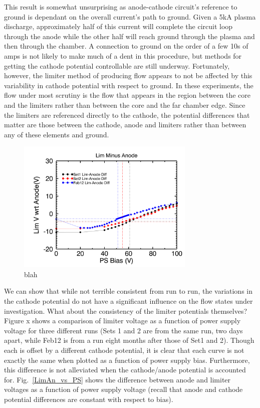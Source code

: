 \documentclass[aip,pop,amsmath,amssymb,preprint,superscriptaddress]{revtex4-1} %
\begin{document}
This result is somewhat unsurprising as anode-cathode circuit's reference to ground is dependant on the overall current's path to ground. Given a 5kA plasma discharge, approximately half of this current will complete the circuit loop through the anode while the other half will reach ground through the plasma and then through the chamber. A connection to ground on the order of a few 10s of amps is not likely to make much of a dent in this procedure, but methods for getting the cathode potential controllable are still underway. Fortunately, however, the limiter method of producing flow appears to not be affected by this variability in cathode potential with respect to ground. In these experiments, the flow under most scrutiny is the flow that appears in the region between the core and the limiters rather than between the core and the far chamber edge. Since the limiters are referenced directly to the cathode, the potential differences that matter are those between the cathode, anode and limiters rather than between any of these elements and ground.

\begin{figure}[!htbp]
\centerline{
\includegraphics[width=8.5cm]{LimAn_vs_PS}}
\caption{\label{fig:LimAn_vs_PS} blah}
\end{figure}

We can show that while not terrible consistent from run to run, the variations in the cathode potential do not have a significant influence on the flow states under investigation. What about the consistency of the limiter potentials themselves? Figure x shows a comparison of limiter voltage as a function of power supply voltage for three different runs (Sets 1 and 2 are from the same run, two days apart, while Feb12 is from a run eight months after those of Set1 and 2). Though each is offset by a different cathode potential, it is clear that each curve is not exactly the same when plotted as a function of power supply bias. Furthermore, this difference is not alleviated when the cathode/anode potential is accounted for. Fig.~\ref{LimAn_vs_PS} shows the difference between anode and limiter voltages as a function of power supply voltage (recall that anode and cathode potential differences are constant with respect to bias). 
\end{document}
